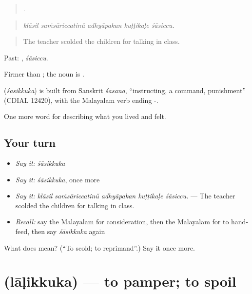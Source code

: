 \begin{quote}
    .
\end{quote}

\begin{quote}
\emph{klāsil saṁsāriccatinŭ adhyāpakan kuṭṭikaḷe śāsiccu.}
\end{quote}

\begin{quote}
The teacher scolded the children for talking in class.
\end{quote}

Past: , \emph{śāsiccu}.

Firmer than  ; the noun is .

\begin{cousinweb}
\textbf{} (\emph{śāsikkuka}) is built from Sanskrit \emph{śāsana}, \textquotedblleft{}instructing, a command, punishment\textquotedblright{} (CDIAL 12420), with the Malayalam verb ending -.
\end{cousinweb}

\begin{grammarlens}[title={What you've built}]
One more word for describing what you lived and felt.
\end{grammarlens}

\subsection*{Your turn}
\begin{itemize}
\raggedright
  \item \emph{Say it:} \emph{śāsikkuka}
  \item \emph{Say it:} \emph{śāsikkuka}, once more
  \item \emph{Say it:} \emph{klāsil saṁsāriccatinŭ adhyāpakan kuṭṭikaḷe śāsiccu.} — The teacher scolded the children for talking in class.
  \item \emph{Recall:} say the Malayalam for consideration, then the Malayalam for to hand-feed, then say \emph{śāsikkuka} again
\end{itemize}

\begin{tcolorbox}[breakable,colback=teal!4,colframe=teal!35!black,title={Before you move on}]
What does  mean? (\textquotedblleft{}To scold; to reprimand\textquotedblright{}.) Say it once more.
\end{tcolorbox}
\section[\texorpdfstring{\ml{ലാളിക്കുക} (lāḷikkuka)}{ലാളിക്കുക (lāḷikkuka)}]{ (lāḷikkuka) — to pamper; to spoil}

